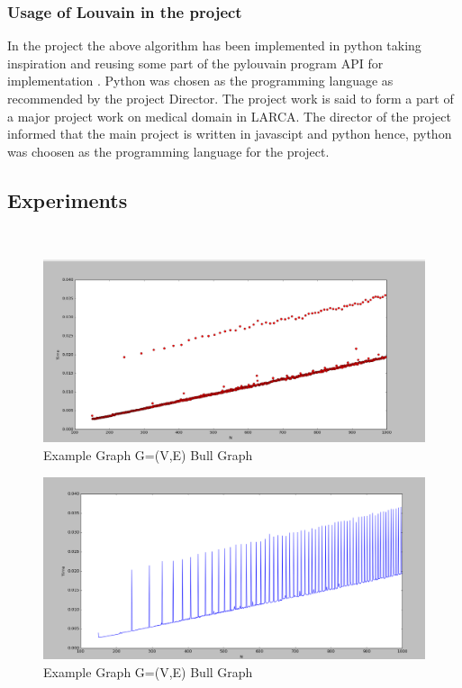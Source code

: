 \subsubsection{Usage of Louvain in the project}
In the project the above algorithm has been implemented in python taking inspiration and reusing some part of the pylouvain program API for implementation \cite{pylouvain}. Python was chosen as the programming language as recommended by the project Director. The project work is said to form a part of a major project work on medical domain in LARCA. The director of the project informed that the main project is written in javascipt and python hence, python was choosen as the programming language for the project.

\subsection{Experiments}
\cite{githubtest1}
\\
\begin{figure}[H]
\centering
\includegraphics[scale=0.3]{e1000.png}
\caption{Example Graph G=(V,E) Bull Graph}
\end{figure}

\begin{figure}[H]
\centering
\includegraphics[scale=0.3]{e1000b.png}
\caption{Example Graph G=(V,E) Bull Graph}
\end{figure}

